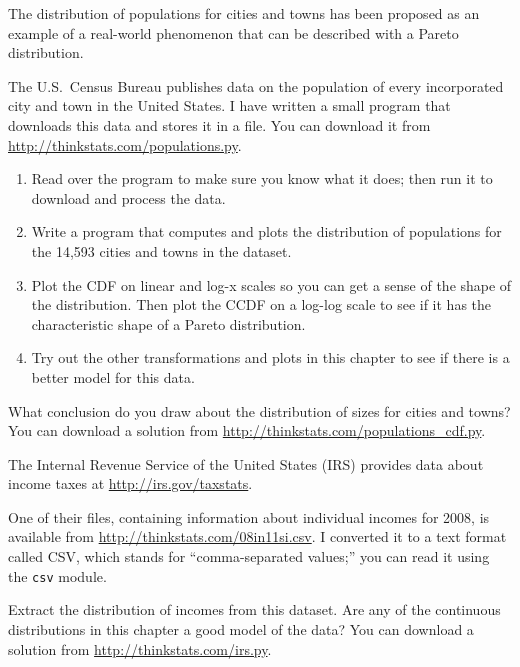 \documentclass[12pt]{book}
\begin{document}
\begin{exercise}
The distribution of populations for cities and towns has been proposed
as an example of a real-world phenomenon that can be described
with a Pareto distribution.

The U.S.~Census Bureau publishes data on the population of every
incorporated city and town in the United States.  I have written a
small program that downloads this data and stores it in a file.  You
can download it from \url{http://thinkstats.com/populations.py}.

\begin{enumerate}

\item Read over the program to make sure you know what it does; then
  run it to download and process the data.

\item Write a program that computes and plots the distribution of
  populations for the 14,593 cities and towns in the dataset.

\item Plot the CDF on linear and log-x scales so you can get a sense
  of the shape of the distribution.  Then plot the CCDF on a log-log
  scale to see if it has the characteristic shape of a Pareto
  distribution.

\item Try out the other transformations and plots in this chapter to
  see if there is a better model for this data.

\end{enumerate}

What conclusion do you draw about the distribution of sizes
for cities and towns?  You can download a solution from
\url{http://thinkstats.com/populations_cdf.py}.

\end{exercise}


\begin{exercise}
\label{irs}

The Internal Revenue Service of the United States (IRS) provides data
about income taxes at \url{http://irs.gov/taxstats}.

One of their files, containing information about individual incomes
for 2008, is available from \url{http://thinkstats.com/08in11si.csv}.  I
converted it to a text format called CSV, which stands for
``comma-separated values;'' you can read it using the {\tt csv}
module.

Extract the distribution of incomes from this dataset.  Are any of
the continuous distributions in this chapter a good model of
the data?  You can download a solution from \url{http://thinkstats.com/irs.py}.

\end{exercise}
\end{document}
